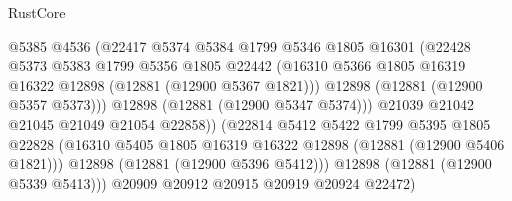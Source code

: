 \begin{lexlean}{RustCore}
\begin{coremodule}
                                    @5385
                                    @4536
                                    (@22417
                                      @5374
                                      @5384
                                      @1799
                                      @5346
                                      @1805
                                      @16301
                                      (@22428
                                        @5373
                                        @5383
                                        @1799
                                        @5356
                                        @1805
                                        @22442
                                        (@16310
                                          @5366
                                          @1805
                                          @16319
                                          @16322
                                          @12898
                                          (@12881 (@12900 @5367 @1821)))
                                        @12898
                                        (@12881 (@12900 @5357 @5373)))
                                      @12898
                                      (@12881 (@12900 @5347 @5374)))
                                    @21039
                                    @21042
                                    @21045
                                    @21049
                                    @21054
                                    @22858))
                                (@22814
                                  @5412
                                  @5422
                                  @1799
                                  @5395
                                  @1805
                                  @22828
                                  (@16310
                                    @5405
                                    @1805
                                    @16319
                                    @16322
                                    @12898
                                    (@12881 (@12900 @5406 @1821)))
                                  @12898
                                  (@12881 (@12900 @5396 @5412)))
                                @12898
                                (@12881 (@12900 @5339 @5413)))
                              @20909
                              @20912
                              @20915
                              @20919
                              @20924
                              @22472)

\end{coremodule}
\end{lexlean}
